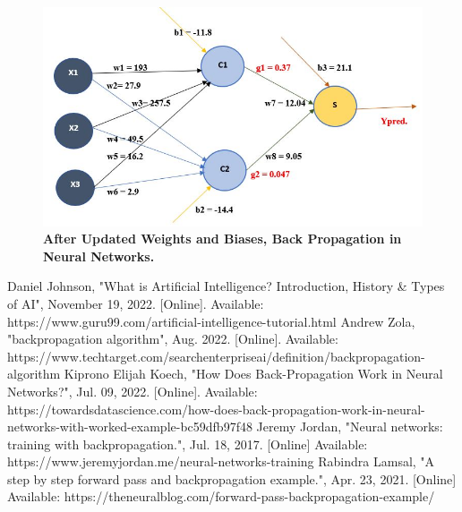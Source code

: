 \documentclass{article}
\begin{document}
\pagebreak
\begin{figure}[!htb]
    \centering
    \includegraphics[width=0.85\linewidth]{Back Propagation_Updated Weights and Biases.JPG}
    \caption{\textbf{After Updated Weights and Biases, Back Propagation in Neural Networks.}}
    \label{fig:P1Q3b}
\end{figure}
\pagebreak


    \begin{thebibliography}{10}
         Daniel Johnson, "What is Artificial Intelligence? Introduction, History & Types of AI", November 19, 2022. [Online]. Available: https://www.guru99.com/artificial-intelligence-tutorial.html
         Andrew Zola, "backpropagation algorithm", Aug. 2022. [Online]. Available: https://www.techtarget.com/searchenterpriseai/definition/backpropagation-algorithm
		 Kiprono Elijah Koech, "How Does Back-Propagation Work in Neural Networks?", Jul. 09, 2022. [Online]. Available: https://towardsdatascience.com/how-does-back-propagation-work-in-neural-networks-with-worked-example-bc59dfb97f48
         Jeremy Jordan, "Neural networks: training with backpropagation.", Jul. 18, 2017. [Online] Available: https://www.jeremyjordan.me/neural-networks-training
         Rabindra Lamsal, "A step by step forward pass and backpropagation example.", Apr. 23, 2021. [Online] Available: https://theneuralblog.com/forward-pass-backpropagation-example/
    \end{thebibliography}
\end{document}
